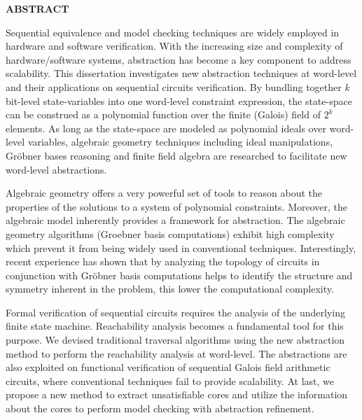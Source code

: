 \begin{center}{\bf ABSTRACT}\end{center}
Sequential equivalence and model checking techniques are widely
employed in hardware and software verification. With the increasing
size and complexity of hardware/software systems, abstraction has
become a key component to address scalability.
This dissertation investigates new abstraction techniques at word-level and their applications 
on sequential circuits verification. By bundling together $k$ bit-level state-variables into
one word-level constraint expression, the state-space can be construed
as a polynomial function over the finite (Galois) field of $2^k$
elements. As long as the state-space are modeled as polynomial ideals
over word-level variables, algebraic geometry techniques including ideal manipulations,
Gr\"obner bases reasoning and finite field algebra are researched to 
facilitate new word-level abstractions.

Algebraic geometry offers a very powerful set of tools to reason about
the properties of the solutions to a system of polynomial
constraints. Moreover, the algebraic model inherently provides a
framework for abstraction. 
The algebraic geometry algorithms (Groebner basis computations) exhibit
high complexity which prevent it from being widely used in conventional techniques. 
Interestingly, recent experience has shown that
by analyzing the topology of circuits in conjunction with Gr\"obner
basis computations helps to identify the structure and symmetry
inherent in the problem, this lower the computational complexity.

Formal verification of sequential circuits requires the analysis of
the underlying finite state machine. Reachability analysis becomes a
fundamental tool for this purpose. We devised traditional traversal algorithms 
using the new abstraction method to perform
the reachability analysis at word-level. 
The abstractions are also exploited on functional
verification of sequential Galois field arithmetic circuits, where conventional 
techniques fail to provide scalability. At last, we propose a new method to extract 
unsatisfiable cores and utilize the information about the cores to 
perform model checking with abstraction refinement.